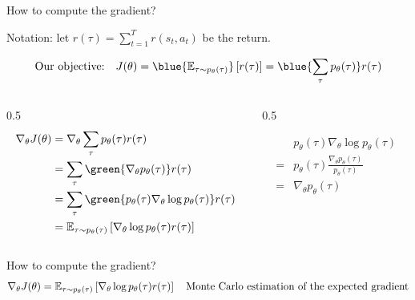 \documentclass[usenames,dvipsnames,notes,11pt,aspectratio=169,hyperref={colorlinks=true, linkcolor=blue}]{beamer}
\begin{document}
\begin{frame}
    {How to compute the gradient?}

    Notation: let $r(\tau)=\sum_{t=1}^T r(s_t, a_t)$ be the return.
    \pause

    $$
    \text{Our objective:} \quad
    J(\theta)=\blue{\BE_{\tau\sim p_\theta(\tau)}}\pb{r(\tau)}
    =\blue{\sum_\tau p_\theta(\tau)} r(\tau)
    $$
    \pause

    \begin{columns}
        \begin{column}{0.5\textwidth}
    \begin{align*}
    \nabla_\theta J(\theta) &= \nabla_\theta \sum_\tau p_\theta(\tau) r(\tau)\\
        &= \sum_\tau \green{\nabla_\theta p_\theta(\tau)} r(\tau)\\
        &= \sum_\tau \green{p_\theta(\tau) \nabla_\theta \log p_\theta(\tau)} r(\tau)\\
        &= \BE_{\tau\sim p_\theta(\tau)}\pb{\nabla_\theta \log p_\theta(\tau) r(\tau)}
    \end{align*}
        \end{column}
        \begin{column}{0.5\textwidth}
            \begin{mdframed}[backgroundcolor=gray!20, linewidth=0pt, frametitle={log derivative trick}]
    \begin{align*}
        &p_\theta(\tau) \nabla_\theta \log p_\theta(\tau)\\
        =&   p_\theta(\tau) \frac{\nabla_\theta p_\theta(\tau)}{p_\theta(\tau)}\\
        =& \nabla_\theta p_\theta(\tau)
    \end{align*}
            \end{mdframed}
        \end{column}
    \end{columns}
\end{frame}

\begin{frame}
    {How to compute the gradient?}
    $$
    \nabla_\theta J(\theta) = \mathbb{E}_{\tau\sim p_\theta(\tau)}\left[ \nabla_\theta \log p_\theta(\tau) r(\tau) \right]
    \quad \text{Monte Carlo estimation of the expected gradient}
    $$

\end{frame}
\end{document}
